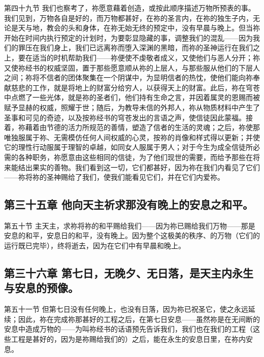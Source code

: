 第四十九节 我们也察考了，祢愿意藉着创造，或按此顺序描述万物所预表的事。我们见到，万物各自是好的，而万物都甚好，在祢的圣言内，在祢的独生子内，无论是天与地，教会的头和身体，在祢无始无终的预定中，没有早晨与晚上。但当祢开始在时间内执行预定的计划时，为要彰显隐藏的事，调整我们的混乱——因为我们的罪压在我们身上，我们已远离祢而堕入深渊的黑暗，而祢的圣神运行在我们之上，要在适当的时机帮助我们——祢便使不虔敬者成义，又使他们与恶人分开；祢又使祢经书的权威坚固，置于那些愿意顺从祢的上层人，与那些服从他们的下层人之间；祢将不信者的团体聚集在一个阴谋中，为显明信者的热忱，使他们能向祢奉献慈悲的工作，就是将地上的财富分给穷人，以获得天上的财富。此后，祢在穹苍中点燃了一些光体，就是祢的圣者们，他们持有生命之言，并因着属灵的恩赐而被赋予显赫的权威，照耀于世；随后，为教导未信的外邦人，祢从物质材料中产生了圣事和可见的奇迹，以及按祢经书的穹苍发出的言语之声，使信徒因此蒙福。接着，祢藉着由节德的活力所规范的善情，塑造了信者的生活的灵魂；之后，祢使那唯独服属于祢、无需模仿任何人间权威的心灵，按祢的肖像和样式得以更新；并使它的理性行动服属于理智的卓越，如同女人服属于男人；对于今生为成全信徒所必需的各种职务，祢愿意由这些相同的信徒，为了他们现世的需要，而给予那些在将来能结出果实的善物。我们看到这一切，它们都甚好，因为祢在我们内看见了它们——祢将祢的圣神赐给了我们，使我们能看见它们，并在它们内爱祢。\par


\subsection{第三十五章 他向天主祈求那没有晚上的安息之和平。}

第五十节 主天主，求祢将祢的和平赐给我们——因为祢已赐给我们万物——那是安息的和平，安息日的和平，没有晚上。因为整个这极美的秩序、的万物（它们的运行既已完毕），终将逝去，因为在它们中有早晨和晚上。\par


\subsection{第三十六章 第七日，无晚夕、无日落，是天主内永生与安息的预像。}

第五十一节 但第七日没有任何晚上，也没有日落，因为祢已祝圣它，使之永远延续；因此，祢在完成祢那甚好的工程之后，在第七日安息——虽然祢是在无间断的安息中造成万物的——为叫祢经书的话语预先告诉我们，我们也在我们的工程（这些工程是甚好的，因为是祢赐给我们的）之后，能在永生的安息日里，在祢内安息。\par

